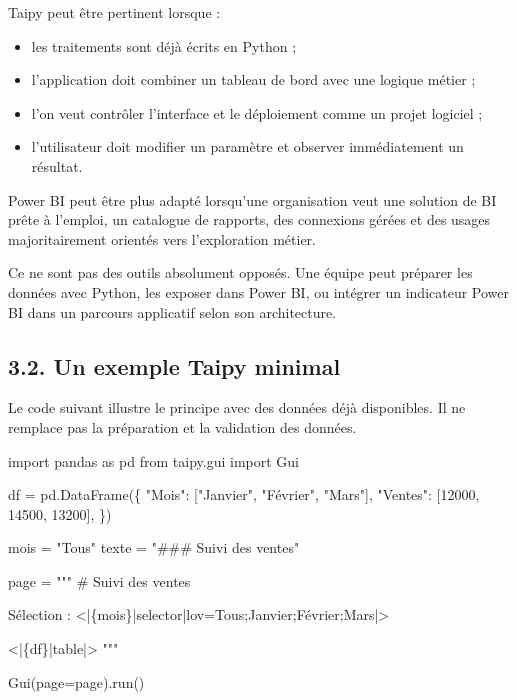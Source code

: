 \documentclass[
  french,
  letterpaper,
  open=any]{scrbook}
\newenvironment{Shaded}{\begin{snugshade}}{\end{snugshade}}
\newcommand{\DecValTok}[1]{\textcolor[rgb]{0.68,0.00,0.00}{#1}}
\newcommand{\ImportTok}[1]{\textcolor[rgb]{0.00,0.46,0.62}{#1}}
\newcommand{\NormalTok}[1]{\textcolor[rgb]{0.00,0.23,0.31}{#1}}
\newcommand{\OperatorTok}[1]{\textcolor[rgb]{0.37,0.37,0.37}{#1}}
\newcommand{\SpecialCharTok}[1]{\textcolor[rgb]{0.37,0.37,0.37}{#1}}
\newcommand{\StringTok}[1]{\textcolor[rgb]{0.13,0.47,0.30}{#1}}
\providecommand{\tightlist}{%
  \setlength{\itemsep}{0pt}\setlength{\parskip}{0pt}}
\theoremstyle{definition}
\theoremstyle{definition}
\theoremstyle{remark}
\begin{document}
Taipy peut être pertinent lorsque :

\begin{itemize}
\tightlist
\item
  les traitements sont déjà écrits en Python ;
\item
  l'application doit combiner un tableau de bord avec une logique métier
  ;
\item
  l'on veut contrôler l'interface et le déploiement comme un projet
  logiciel ;
\item
  l'utilisateur doit modifier un paramètre et observer immédiatement un
  résultat.
\end{itemize}

Power BI peut être plus adapté lorsqu'une organisation veut une solution
de BI prête à l'emploi, un catalogue de rapports, des connexions gérées
et des usages majoritairement orientés vers l'exploration métier.

Ce ne sont pas des outils absolument opposés. Une équipe peut préparer
les données avec Python, les exposer dans Power BI, ou intégrer un
indicateur Power BI dans un parcours applicatif selon son architecture.

\subsection{3.2. Un exemple Taipy
minimal}\label{un-exemple-taipy-minimal}

Le code suivant illustre le principe avec des données déjà disponibles.
Il ne remplace pas la préparation et la validation des données.

\begin{Shaded}
\begin{Highlighting}[]
\ImportTok{import}\NormalTok{ pandas }\ImportTok{as}\NormalTok{ pd}
\ImportTok{from}\NormalTok{ taipy.gui }\ImportTok{import}\NormalTok{ Gui}

\NormalTok{df }\OperatorTok{=}\NormalTok{ pd.DataFrame(\{}
    \StringTok{"Mois"}\NormalTok{: [}\StringTok{"Janvier"}\NormalTok{, }\StringTok{"Février"}\NormalTok{, }\StringTok{"Mars"}\NormalTok{],}
    \StringTok{"Ventes"}\NormalTok{: [}\DecValTok{12000}\NormalTok{, }\DecValTok{14500}\NormalTok{, }\DecValTok{13200}\NormalTok{],}
\NormalTok{\})}

\NormalTok{mois }\OperatorTok{=} \StringTok{"Tous"}
\NormalTok{texte }\OperatorTok{=} \StringTok{"\#\#\# Suivi des ventes"}

\NormalTok{page }\OperatorTok{=} \StringTok{"""}
\StringTok{\# Suivi des ventes}

\StringTok{Sélection : \textless{}|}\SpecialCharTok{\{mois\}}\StringTok{|selector|lov=Tous;Janvier;Février;Mars|\textgreater{}}

\StringTok{\textless{}|}\SpecialCharTok{\{df\}}\StringTok{|table|\textgreater{}}
\StringTok{"""}

\NormalTok{Gui(page}\OperatorTok{=}\NormalTok{page).run()}
\end{Highlighting}
\end{Shaded}
\end{document}
